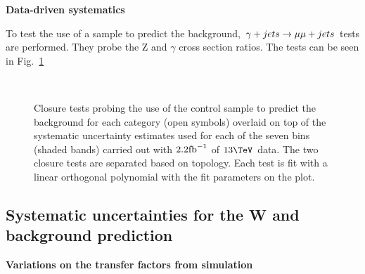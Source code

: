 {\bf Data-driven systematics}

To test the use of a \gj sample to predict the \zinv background, $\gj
\rightarrow \mmj$
tests are performed. They probe the Z and $\gamma$ cross section
ratios. The tests can be seen in Fig.~\ref{fig:closurePhoToMuMu}

\begin{figure}[h!]
  \begin{center}
    ~~
    \caption{Closure tests probing the use of the \gj control sample
      to predict the \znunu background for each
      \njet category (open symbols) overlaid on top of the systematic
      uncertainty estimates used for each of the seven \scalht bins
      (shaded bands) carried out with $2.2\ifb$ of $13\tev$
      data. The two closure tests are separated based on topology.
      Each test is fit with a linear orthogonal polynomial with the
      fit parameters on the plot.}
    \label{fig:closurePhoToMuMu}
  \end{center} 
\end{figure}

\subsection{Systematic uncertainties for the W and \ttbar background
prediction}

{\bf Variations on the transfer factors from simulation}

